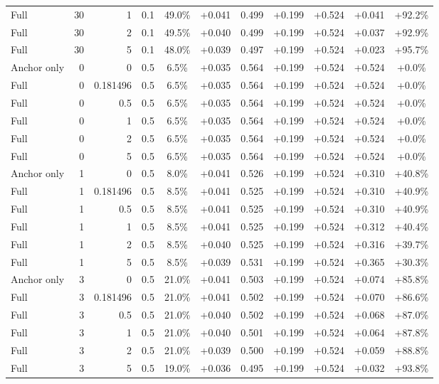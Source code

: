 \begin{table}[htbp]
\begin{tabular}{lrrrccccccc}
Full & 30 & 1 & 0.1 & 49.0\% & +0.041 & 0.499 & +0.199 & +0.524 & +0.041 & +92.2\% \\
Full & 30 & 2 & 0.1 & 49.5\% & +0.040 & 0.499 & +0.199 & +0.524 & +0.037 & +92.9\% \\
Full & 30 & 5 & 0.1 & 48.0\% & +0.039 & 0.497 & +0.199 & +0.524 & +0.023 & +95.7\% \\
Anchor only & 0 & 0 & 0.5 & 6.5\% & +0.035 & 0.564 & +0.199 & +0.524 & +0.524 & +0.0\% \\
Full & 0 & 0.181496 & 0.5 & 6.5\% & +0.035 & 0.564 & +0.199 & +0.524 & +0.524 & +0.0\% \\
Full & 0 & 0.5 & 0.5 & 6.5\% & +0.035 & 0.564 & +0.199 & +0.524 & +0.524 & +0.0\% \\
Full & 0 & 1 & 0.5 & 6.5\% & +0.035 & 0.564 & +0.199 & +0.524 & +0.524 & +0.0\% \\
Full & 0 & 2 & 0.5 & 6.5\% & +0.035 & 0.564 & +0.199 & +0.524 & +0.524 & +0.0\% \\
Full & 0 & 5 & 0.5 & 6.5\% & +0.035 & 0.564 & +0.199 & +0.524 & +0.524 & +0.0\% \\
Anchor only & 1 & 0 & 0.5 & 8.0\% & +0.041 & 0.526 & +0.199 & +0.524 & +0.310 & +40.8\% \\
Full & 1 & 0.181496 & 0.5 & 8.5\% & +0.041 & 0.525 & +0.199 & +0.524 & +0.310 & +40.9\% \\
Full & 1 & 0.5 & 0.5 & 8.5\% & +0.041 & 0.525 & +0.199 & +0.524 & +0.310 & +40.9\% \\
Full & 1 & 1 & 0.5 & 8.5\% & +0.041 & 0.525 & +0.199 & +0.524 & +0.312 & +40.4\% \\
Full & 1 & 2 & 0.5 & 8.5\% & +0.040 & 0.525 & +0.199 & +0.524 & +0.316 & +39.7\% \\
Full & 1 & 5 & 0.5 & 8.5\% & +0.039 & 0.531 & +0.199 & +0.524 & +0.365 & +30.3\% \\
Anchor only & 3 & 0 & 0.5 & 21.0\% & +0.041 & 0.503 & +0.199 & +0.524 & +0.074 & +85.8\% \\
Full & 3 & 0.181496 & 0.5 & 21.0\% & +0.041 & 0.502 & +0.199 & +0.524 & +0.070 & +86.6\% \\
Full & 3 & 0.5 & 0.5 & 21.0\% & +0.040 & 0.502 & +0.199 & +0.524 & +0.068 & +87.0\% \\
Full & 3 & 1 & 0.5 & 21.0\% & +0.040 & 0.501 & +0.199 & +0.524 & +0.064 & +87.8\% \\
Full & 3 & 2 & 0.5 & 21.0\% & +0.039 & 0.500 & +0.199 & +0.524 & +0.059 & +88.8\% \\
Full & 3 & 5 & 0.5 & 19.0\% & +0.036 & 0.495 & +0.199 & +0.524 & +0.032 & +93.8\% \\

\end{tabular}
\end{table}
